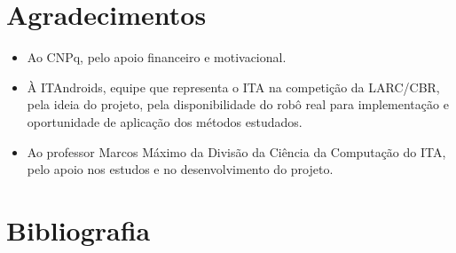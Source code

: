 \documentclass[a4paper,12pt]{article}
\begin{document}
\section{Agradecimentos}

\begin{itemize}
\item Ao CNPq, pelo apoio financeiro e motivacional.
\item À ITAndroids, equipe que representa o ITA na competição da LARC/CBR, pela ideia do projeto, pela disponibilidade do robô real para implementação e oportunidade de aplicação dos métodos estudados.
\item Ao professor Marcos Máximo da Divisão da Ciência da Computação do ITA, pelo apoio nos estudos e no desenvolvimento do projeto.

\end{itemize}

\section{Bibliografia}

\printbibliography
\end{document}
